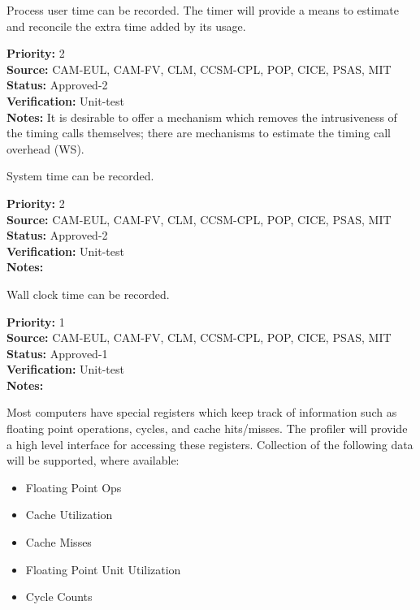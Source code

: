 
Process user time can be recorded.
The timer will provide a means to estimate and reconcile the extra time added by its usage.

\begin{reqlist}
{\bf Priority:} 2 \\
{\bf Source:} CAM-EUL, CAM-FV, CLM, CCSM-CPL, POP, CICE, PSAS, MIT \\
{\bf Status:} Approved-2 \\
{\bf Verification:} Unit-test \\
{\bf Notes:} It is desirable to offer a mechanism which removes the
  intrusiveness of the timing calls themselves; there are mechanisms
  to estimate the timing call overhead (WS).
  
\end{reqlist}


System time can be recorded.

\begin{reqlist}
{\bf Priority:} 2 \\
{\bf Source:} CAM-EUL, CAM-FV, CLM, CCSM-CPL, POP, CICE, PSAS, MIT \\
{\bf Status:} Approved-2 \\
{\bf Verification:} Unit-test \\
{\bf Notes:} 
\end{reqlist}



Wall clock time can be recorded.

\begin{reqlist}
{\bf Priority:} 1 \\
{\bf Source:} CAM-EUL, CAM-FV, CLM, CCSM-CPL, POP, CICE, PSAS, MIT \\
{\bf Status:} Approved-1 \\
{\bf Verification:} Unit-test \\
{\bf Notes:} 
\end{reqlist}



Most computers have special registers which keep track of information such
as floating point operations, cycles, and cache hits/misses.  The profiler will
provide a high level interface for accessing these registers.
Collection of the following data will be supported, where available:
\begin{itemize}
\item{Floating Point Ops}
\item{Cache Utilization}
\item{Cache Misses}
\item{Floating Point Unit Utilization}
\item{Cycle Counts}
\end{itemize}

